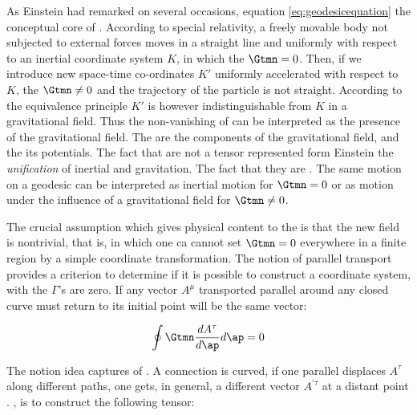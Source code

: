 {As Einstein had remarked on several occasions, equation \cref{eq:geodesicequation} the conceptual core of \tr. According to special relativity, a freely movable body not subjected to external forces moves in a straight line and uniformly with respect to an inertial coordinate system $K$, in which the $\Gtmn=0$. Then, if we introduce new space-time co-ordinates $K'$ uniformly accelerated with respect to $K$, the $\Gtmn\neq 0$ and the trajectory of the particle is not straight. According to the equivalence principle $K'$ is however indistinguishable from $K$ in a gravitational field. Thus the non-vanishing of \Gtmn can be interpreted as the presence of the gravitational field. The \Gtmn are the components of the gravitational field, and the \gmn its potentials. The fact that \Gtmn are not a tensor represented form Einstein the \emph{unification} of inertial and gravitation. The fact that they are . The same motion on a geodesic can be interpreted as inertial motion for $\Gtmn=0$ or as motion under the influence of a gravitational field for $\Gtmn \neq 0$.



The crucial assumption which gives physical content to the  is that the new field is nontrivial, that is, in which one ca cannot set $\Gtmn=0$ everywhere in a finite region by a simple coordinate transformation. The notion of parallel transport provides a criterion to determine if it is possible to construct a coordinate system, with the $\Gamma$'s are zero. If any vector $A^{\mu}$ transported parallel around any closed curve must return to its initial point will be the same vector:

$$
\oint \Gtmn \frac{d A^{\tau}}{d \ap} d \ap=0
$$

The notion idea captures of . A connection is curved, if one parallel displaces $A^\tau$ along different paths, one gets, in general, a different vector $A^{\prime \tau}$ at a distant point \citep[028-01-03, 37]{HR}.  , is to construct the following tensor:

}
